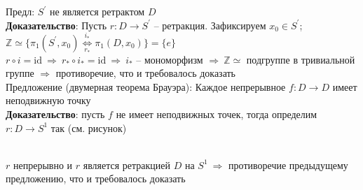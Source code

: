 	Предл: $S^{\prime}$ не является ретрактом $D$\\
	\textbf{Доказательство}: Пусть $r: D \rightarrow S^{\prime}$ -- ретракция. Зафиксируем $x_0 \in S^{\prime}$; $\mathbb{Z} \simeq \{\pi_1 (S^{\prime},x_0) \overset{i_*}{\underset{r_*}{\Leftrightarrow}} \pi_1 (D,x_0)\} = \{e\}$\\
	$r \circ i =  \text{id}\ \Rightarrow\ r_* \circ i_* =  \text{id}\ \Rightarrow\ i_*$ -- мономорфизм $\Rightarrow\ \mathbb{Z} \simeq$ подгруппе в тривиальной группе $\Rightarrow$ противоречие, что и требовалось доказать\\
	Предложение (двумерная теорема Брауэра): Каждое непрерывное $f: D\rightarrow D$ имеет неподвижную точку\\
	\textbf{Доказательство}: пусть $f$ не имеет неподвижных точек, тогда определим $r: D\rightarrow S^1$ так (см. рисунок)\\
	\begin{figure}[h]
	\end{figure}\\
	$r$ непрерывно и $r$ является ретракцией $D$ на $S^1\ \Rightarrow$ противоречие предыдущему предложению, что и требовалось доказать
	


\newpage
